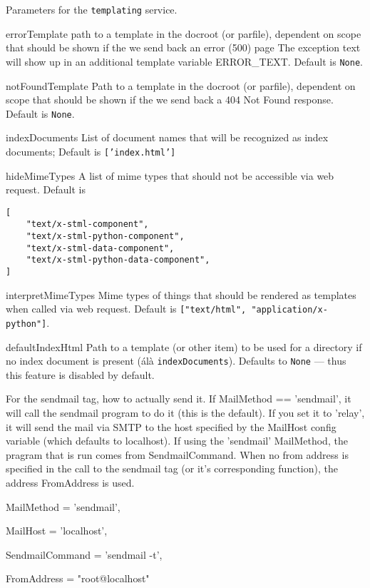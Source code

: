 \documentclass[titlepage]{manual}
\begin{document}
Parameters for the \texttt{templating} service.
\begin{argdesc}
\item[errorTemplate] \nonscope
path to a template in the docroot (or parfile), dependent on scope
that should be shown if the we send back an error (500) page
The exception text will show up in an additional template variable
ERROR_TEXT.
Default is \texttt{None}.
\item[notFoundTemplate] \nonscope
Path to a template in the docroot (or parfile), dependent on scope
that should be shown if the we send back a 404 Not Found response.
Default is \texttt{None}.
\item[indexDocuments]
List of document names that will be recognized as index documents;
Default is \texttt{['index.html']}
\item[hideMimeTypes]
A list of mime types that should not be accessible via web request.
Default is 
\begin{verbatim}
[
    "text/x-stml-component",
    "text/x-stml-python-component",
    "text/x-stml-data-component",
    "text/x-stml-python-data-component",
]
\end{verbatim}
\item[interpretMimeTypes]
Mime types of things that should be rendered as templates when called
via web request.
Default is \texttt{["text/html", "application/x-python"]}.
\item[defaultIndexHtml] 
Path to a template (or other item) to be used for a directory if no
index document is present (\'al\`a \texttt{indexDocuments}).  Defaults to \texttt{None} --- thus this feature is disabled by default.
\end{argdesc}

For the sendmail tag, how to actually send it.
If MailMethod == 'sendmail', it will call the sendmail program to do
it (this is the default).  If you set it to 'relay', it will send the
mail via SMTP to the host specified by the MailHost config variable
(which defaults to localhost).  If using the 'sendmail' MailMethod,
the pragram that is run comes from SendmailCommand.  When no from
address is specified in the call to the sendmail tag (or it's
corresponding function), the address FromAddress is used.
\begin{argdesc}
\item[MailMethod] = 'sendmail',
\item[MailHost] = 'localhost',
\item[SendmailCommand] = 'sendmail -t',
\item[FromAddress] = "root@localhost"
\end{argdesc}
\end{document}
